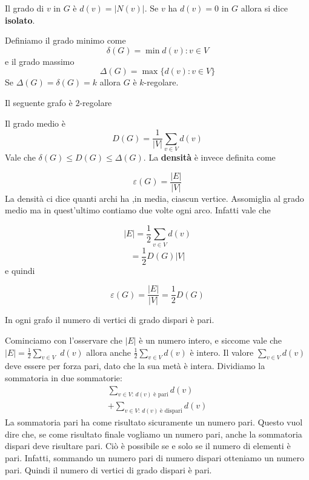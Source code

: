 \documentclass[12pt]{report}
\begin{document}
\noindent
Il grado di $v$ in $G$ è $d(v) = |N(v)|$. Se $v$ ha $d(v) = 0$ in $G$ allora si dice \textbf{isolato}.


\noindent 
Definiamo il grado minimo come $$\delta(G) = \min {d(v): v \in V}$$ e il grado massimo $$\Delta(G) = \max \{d(v) : v \in V\}$$ Se $\Delta(G) = \delta(G) = k$ allora $G$ è $k$-regolare.

\begin{exmp}
    Il seguente grafo è $2$-regolare
\end{exmp}

\noindent 
Il grado medio è
$$D(G) = \frac{1}{|V|} \sum_{v \in V} d(v)$$
Vale che $\delta(G) \leq D(G) \leq \Delta(G)$. La \textbf{densità} è invece definita come 

$$\varepsilon(G) = \frac{|E|}{|V|}$$
La densità ci dice quanti archi ha ,in media, ciascun vertice. Assomiglia al grado medio ma in quest'ultimo contiamo due volte ogni arco. Infatti vale che 

$$|E| = \frac{1}{2} \sum_{v \in V} d(v)$$
$$= \frac{1}{2} D(G) |V|$$
e quindi

$$\varepsilon(G) = \frac{|E|}{|V|}  = \frac{1}{2} D(G) $$

\begin{fatto}
In ogni grafo il numero di vertici di grado dispari è pari.
\end{fatto}

\begin{dimo}
    Cominciamo con l'osservare che $|E|$  è un numero intero, e siccome vale che  $|E| = \frac{1}{2} \sum_{v \in V}$ $d(v)$ allora anche $\frac{1}{2} \sum_{v \in V} d(v)$ è intero. Il valore $\sum_{v \in V} d(v)$ deve essere per forza pari, dato che la sua metà è intera. Dividiamo la sommatoria in due sommatorie:
\begin{align*}
\sum_{v \in V:\, d(v) \; \text{è pari}} d(v)  \\ + \sum_{v \in V:\, d(v) \; \text{è dispari}} d(v)
    \end{align*}
    La sommatoria pari ha come risultato sicuramente un numero pari. Questo vuol dire che, se come risultato finale vogliamo un numero pari, anche la sommatoria dispari deve risultare pari. Ciò è possibile se e solo se il numero di elementi è pari. Infatti, sommando un numero pari di numero dispari otteniamo un numero pari. Quindi il numero di vertici di grado dispari è pari.
\end{dimo}
\end{document}
